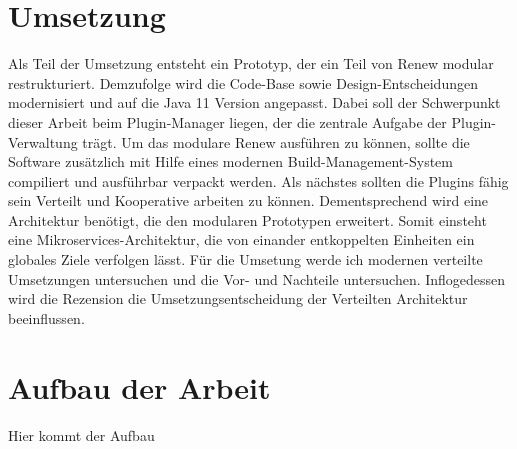 \section{Umsetzung}
Als Teil der Umsetzung entsteht ein Prototyp, der ein Teil von Renew modular restrukturiert. 
Demzufolge wird die Code-Base sowie Design-Entscheidungen modernisiert und auf die Java 11 Version angepasst.
Dabei soll der Schwerpunkt dieser Arbeit beim Plugin-Manager liegen, der die zentrale Aufgabe der Plugin-Verwaltung trägt.    
Um das modulare Renew ausführen zu können, sollte die Software zusätzlich mit Hilfe eines modernen Build-Management-System compiliert und ausführbar verpackt werden. 
Als nächstes sollten die Plugins fähig sein Verteilt und Kooperative arbeiten zu können. Dementsprechend wird eine Architektur benötigt, die den modularen Prototypen erweitert. 
Somit einsteht eine Mikroservices-Architektur, die von einander entkoppelten Einheiten ein globales Ziele verfolgen lässt. \newline 
Für die Umsetung werde ich modernen verteilte Umsetzungen untersuchen und die Vor- und Nachteile untersuchen.
Inflogedessen wird die Rezension die Umsetzungsentscheidung der Verteilten Architektur beeinflussen.

\section{Aufbau der Arbeit}
Hier kommt der Aufbau 


